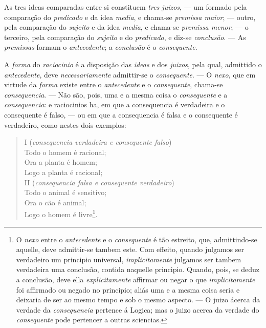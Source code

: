 As tres ideas comparadas entre si constituem \emph{tres juizos}, --- um formado pela
comparação do \emph{predicado} e da idea \emph{media}, e chama-se \emph{premissa maior};
--- outro, pela comparação do \emph{sujeito} e da idea \emph{media}, e chama-se
\emph{premissa menor}; --- o terceiro, pela comparação do \emph{sujeito} e do
\emph{predicado}, e diz-se \emph{conclusão}. --- As \emph{premissas} formam o
\emph{antecedente}; a \emph{conclusão} é o \emph{consequente}.

 A \emph{forma} do \emph{raciocinio} é a disposição das \emph{ideas} e dos
\emph{juizos}, pela qual, admittido o \emph{antecedente}, deve \emph{necessariamente}
admittir-se o \emph{consequente}. --- O \emph{nexo}, que em virtude da \emph{forma} existe
entre o \emph{antecedente} e o \emph{consequente}, chama-se \emph{consequencia}. --- Não
são, pois, uma e a mesma coisa o \emph{consequente} e a \emph{consequencia}: e raciocinios
ha, em que a consequencia é verdadeira e o consequente é falso, --- ou em que a
consequencia é falsa e o consequente é verdadeiro, como nestes dois exemplos:
\begin{quote}\small
I (\emph{consequencia verdadeira e consequente falso})\\
Todo o homem é racional;\\
Ora a planta é homem;\\
Logo a planta é racional;\\
II (\emph{consequencia falsa e consequente verdadeiro})\\
Todo o animal é sensitivo;\\
Ora o cão é animal;\\
Logo o homem é livre\footnote{O \emph{nexo} entre o \emph{antecedente} e o
\emph{consequente} é tão estreito, que, admittindo-se aquelle, deve admittir-se tambem
este. Com effeito, quando julgamos ser verdadeiro um principio universal,
\emph{implicitamente} julgamos ser tambem verdadeira uma conclusão, contida naquelle
principio. Quando, pois, se deduz a conclusão, deve ella \emph{explicitamente} affirmar ou
negar o que \emph{implicitamente} foi affirmado ou negado no principio; aliás uma e a
mesma coisa seria e deixaria de ser ao mesmo tempo e sob o mesmo aspecto. --- O juizo
ácerca da verdade da \emph{consequencia} pertence á Logica; mas o juizo acerca da verdade
do \emph{consequente} pode pertencer a outras sciencias.}.
\end{quote}

